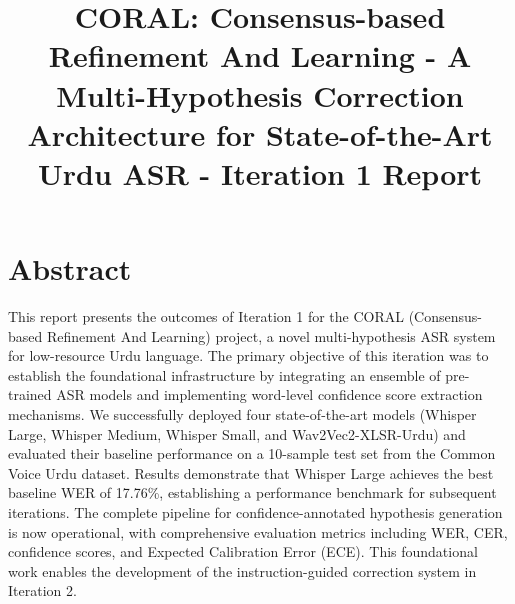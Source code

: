 \documentclass{fast-nuces-bs}
\title{CORAL: Consensus-based Refinement And Learning - A Multi-Hypothesis Correction Architecture for State-of-the-Art Urdu ASR - Iteration 1 Report}
\begin{document}
\setcounter{page}{0}
\thispagestyle{empty}

\chapter*{Abstract}

This report presents the outcomes of Iteration 1 for the CORAL (Consensus-based Refinement And Learning) project, a novel multi-hypothesis ASR system for low-resource Urdu language. The primary objective of this iteration was to establish the foundational infrastructure by integrating an ensemble of pre-trained ASR models and implementing word-level confidence score extraction mechanisms. We successfully deployed four state-of-the-art models (Whisper Large, Whisper Medium, Whisper Small, and Wav2Vec2-XLSR-Urdu) and evaluated their baseline performance on a 10-sample test set from the Common Voice Urdu dataset. Results demonstrate that Whisper Large achieves the best baseline WER of 17.76\%, establishing a performance benchmark for subsequent iterations. The complete pipeline for confidence-annotated hypothesis generation is now operational, with comprehensive evaluation metrics including WER, CER, confidence scores, and Expected Calibration Error (ECE). This foundational work enables the development of the instruction-guided correction system in Iteration 2.

\clearpage

\startmainmatter








\end{document}
